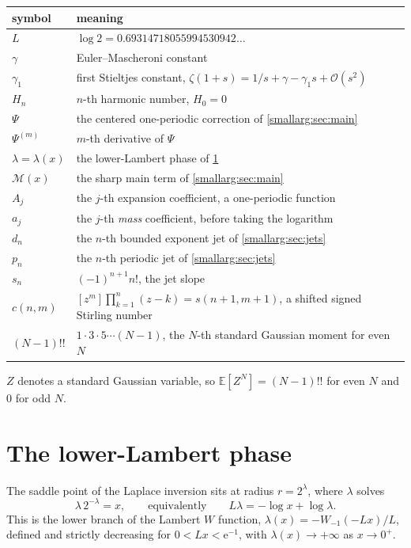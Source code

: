 \documentclass[11pt,oneside]{article}
\theoremstyle{definition}
\theoremstyle{remark}
\newcommand{\e}{\mathrm e}
\newcommand{\E}{\mathbb E}
\newcommand{\bigO}{\mathcal O}
\begin{document}
\begin{center}
\begin{tabular}{@{}ll@{}}
\toprule
symbol & meaning\\
\midrule
$L$ & $\log2=0.69314718055994530942\dots$\\
$\gamma$ & Euler--Mascheroni constant\\
$\gamma_1$ & first Stieltjes constant, $\zeta(1+s)=1/s+\gamma-\gamma_1s+\bigO(s^2)$\\
$H_n$ & $n$-th harmonic number, $H_0=0$\\
$\Psi$ & the centered one-periodic correction of \cref{smallarg:sec:main}\\
$\Psi^{(m)}$ & $m$-th derivative of $\Psi$\\
$\lambda=\lambda(x)$ & the lower-Lambert phase of \cref{smallarg:sec:lambert}\\
$\mathcal M(x)$ & the sharp main term of \cref{smallarg:sec:main}\\
$A_j$ & the $j$-th expansion coefficient, a one-periodic function\\
$a_j$ & the $j$-th \emph{mass} coefficient, before taking the logarithm\\
$d_n$ & the $n$-th bounded exponent jet of \cref{smallarg:sec:jets}\\
$p_n$ & the $n$-th periodic jet of \cref{smallarg:sec:jets}\\
$s_n$ & $(-1)^{n+1}n!$, the jet slope\\
$c(n,m)$ & $[z^m]\prod_{k=1}^n(z-k)=s(n+1,m+1)$, a shifted signed Stirling number\\
$(N-1)!!$ & $1\cdot3\cdot5\cdots(N-1)$, the $N$-th standard Gaussian moment for even $N$\\
\bottomrule
\end{tabular}
\end{center}

$Z$ denotes a standard Gaussian variable, so $\E[Z^N]=(N-1)!!$ for even $N$ and
$0$ for odd $N$.

\section{The lower-Lambert phase}\label{smallarg:sec:lambert}

The saddle point of the Laplace inversion sits at radius $r=2^\lambda$, where
$\lambda$ solves
\begin{equation}\label{smallarg:eq:lambda}
  \lambda\,2^{-\lambda}=x,
  \qquad\text{equivalently}\qquad
  L\lambda=-\log x+\log\lambda .
\end{equation}
This is the lower branch of the Lambert $W$ function,
$\lambda(x)=-W_{-1}(-Lx)/L$, defined and strictly decreasing for
$0<Lx<\e^{-1}$, with $\lambda(x)\to+\infty$ as $x\to0^+$.
\end{document}
